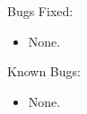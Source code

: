 \noindent Bugs Fixed:

\begin{itemize}

\item None.

\end{itemize}

\noindent Known Bugs:

\begin{itemize}

\item None.

\end{itemize}

